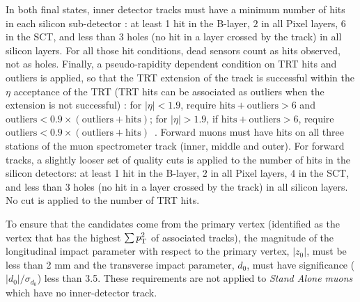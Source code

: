 In both final states, inner detector tracks must have a minimum number of hits in each silicon sub-detector : at least 1 hit in the B-layer, $2$ in all Pixel layers, $6$ in the SCT, and less than 3 holes (no hit in a layer crossed by the track) in all silicon layers. For all those hit conditions, dead sensors count as hits observed, not as holes. Finally, a pseudo-rapidity dependent condition on TRT hits and outliers is applied, so that the TRT extension of the track is successful within the $\eta$ acceptance of the TRT (TRT hits can be associated as outliers when the extension is not successful)  : for $|\eta| < 1.9$, require 
$\mathrm{hits}+\mathrm{outliers} > 6$ and 
$\mathrm{outliers} < 0.9 \times (\mathrm{outliers}+\mathrm{hits})$; for $|\eta| > 1.9$, if $\mathrm{hits}+\mathrm{outliers} > 6$, require 
$\mathrm{outliers} < 0.9 \times (\mathrm{outliers}+\mathrm{hits})$~\cite{MCP}. 
  Forward muons must have hits on all three stations of the muon spectrometer
  track (inner, middle and outer). For forward tracks, a slightly looser set of quality cuts is applied to the number of hits in the silicon detectors: at least 1 hit in the B-layer, $2$ in all Pixel layers, $4$ in the SCT, and less than 3 holes (no hit in a layer crossed by the track) in all silicon layers. No cut is applied to the number of TRT hits.

To ensure that the candidates come from the primary vertex (identified as the
vertex that has the highest $\sum{\ensuremath{p_{\mathrm{T}}}^2}$ of associated tracks), the magnitude
of the longitudinal impact parameter with respect to the primary vertex,
$|z_0|$, must be less than 2 mm and the transverse impact parameter, $d_0$, must
have significance ($|d_0|/\sigma_{d_0}$) less than 3.5. These requirements are not applied
to {\it Stand Alone muons} which have no inner-detector track.

